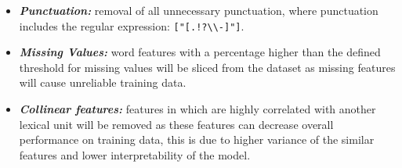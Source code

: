 \begin{itemize}
    \item \textbf{\textit{Punctuation:}} removal of all unnecessary punctuation, where punctuation includes the regular expression: \verb|["[.!?\\-]"]|.
    \item \textbf{\textit{Missing Values:}} word features with a percentage higher than the defined threshold for missing values will be sliced from the dataset as missing features will cause unreliable training data.
    \item \textbf{\textit{Collinear features:}} features in which are highly correlated with another lexical unit will be removed as these features can decrease overall performance on training data, this is due to higher variance of the similar features and lower interpretability of the model.
\end{itemize}